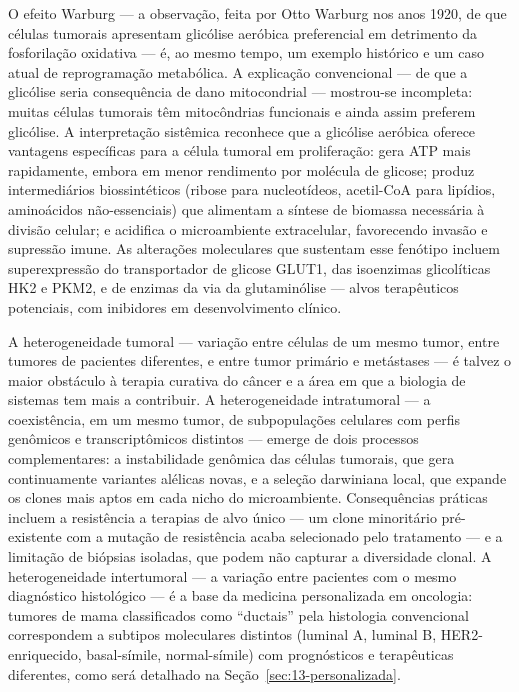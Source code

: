 O efeito Warburg --- a observação, feita por Otto Warburg nos anos 1920, de que células tumorais apresentam glicólise aeróbica preferencial em detrimento da fosforilação oxidativa --- é, ao mesmo tempo, um exemplo histórico e um caso atual de reprogramação metabólica. A explicação convencional --- de que a glicólise seria consequência de dano mitocondrial --- mostrou-se incompleta: muitas células tumorais têm mitocôndrias funcionais e ainda assim preferem glicólise. A interpretação sistêmica reconhece que a glicólise aeróbica oferece vantagens específicas para a célula tumoral em proliferação: gera ATP mais rapidamente, embora em menor rendimento por molécula de glicose; produz intermediários biossintéticos (ribose para nucleotídeos, acetil-CoA para lipídios, aminoácidos não-essenciais) que alimentam a síntese de biomassa necessária à divisão celular; e acidifica o microambiente extracelular, favorecendo invasão e supressão imune. As alterações moleculares que sustentam esse fenótipo incluem superexpressão do transportador de glicose GLUT1, das isoenzimas glicolíticas HK2 e PKM2, e de enzimas da via da glutaminólise --- alvos terapêuticos potenciais, com inibidores em desenvolvimento clínico.

A heterogeneidade tumoral --- variação entre células de um mesmo tumor, entre tumores de pacientes diferentes, e entre tumor primário e metástases --- é talvez o maior obstáculo à terapia curativa do câncer e a área em que a biologia de sistemas tem mais a contribuir. A heterogeneidade intratumoral --- a coexistência, em um mesmo tumor, de subpopulações celulares com perfis genômicos e transcriptômicos distintos --- emerge de dois processos complementares: a instabilidade genômica das células tumorais, que gera continuamente variantes alélicas novas, e a seleção darwiniana local, que expande os clones mais aptos em cada nicho do microambiente. Consequências práticas incluem a resistência a terapias de alvo único --- um clone minoritário pré-existente com a mutação de resistência acaba selecionado pelo tratamento --- e a limitação de biópsias isoladas, que podem não capturar a diversidade clonal. A heterogeneidade intertumoral --- a variação entre pacientes com o mesmo diagnóstico histológico --- é a base da medicina personalizada em oncologia: tumores de mama classificados como ``ductais'' pela histologia convencional correspondem a subtipos moleculares distintos (luminal A, luminal B, HER2-enriquecido, basal-símile, normal-símile) com prognósticos e terapêuticas diferentes, como será detalhado na Seção~\ref{sec:13-personalizada}.


